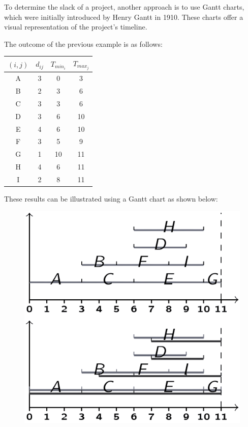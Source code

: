 \documentclass[12pt, a4paper]{report}
\begin{document}
    To determine the slack of a project, another approach is to use Gantt charts, which were initially introduced by Henry Gantt in 1910. 
    These charts offer a visual representation of the project's timeline.
    \begin{example}
        The outcome of the previous example is as follows:
        \begin{table}[H]
            \centering
            \begin{tabular}{cccc}
            \hline
            $(i,j)$ & $d_{ij}$ & $T_{min_i}$ & $T_{max_j}$ \\ \hline
            A       & 3        & 0           & 3           \\
            B       & 2        & 3           & 6           \\
            C       & 3        & 3           & 6           \\
            D       & 3        & 6           & 10          \\
            E       & 4        & 6           & 10          \\
            F       & 3        & 5           & 9           \\
            G       & 1        & 10          & 11          \\
            H       & 4        & 6           & 11          \\
            I       & 2        & 8           & 11          \\ \hline
            \end{tabular}
        \end{table}
        These results can be illustrated using a Gantt chart as shown below:
        \begin{figure}[H]
            \centering
            \includegraphics[width=0.25\linewidth]{images/Gantt.png}
        \end{figure}
    \end{example}
\end{document}
